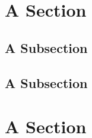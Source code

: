 \documentclass[10pt,a4paper]{scrartcl} %
\begin{document}
    \title{\rmfamily\normalfont{}}
    \author{}
    \date{} %
    
    \maketitle
    
    \begin{abstract}
        \noindent\lipsum[1]
    \end{abstract}
       
    \tableofcontents
    
    \section{A Section}
    \lipsum[1]
    \subsection{A Subsection}
    \lipsum[1]
    \subsection{A Subsection}
    
    \section{A Section}
    \lipsum[1]
    
    \nocite{*}
    
    
\end{document}
